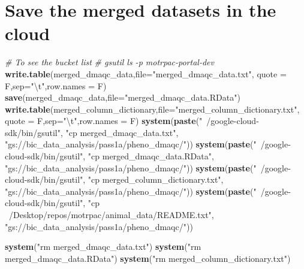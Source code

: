 \documentclass[]{article}
\newenvironment{Shaded}{\begin{snugshade}}{\end{snugshade}}
\newcommand{\KeywordTok}[1]{\textcolor[rgb]{0.13,0.29,0.53}{\textbf{#1}}}
\newcommand{\DataTypeTok}[1]{\textcolor[rgb]{0.13,0.29,0.53}{#1}}
\newcommand{\CharTok}[1]{\textcolor[rgb]{0.31,0.60,0.02}{#1}}
\newcommand{\StringTok}[1]{\textcolor[rgb]{0.31,0.60,0.02}{#1}}
\newcommand{\CommentTok}[1]{\textcolor[rgb]{0.56,0.35,0.01}{\textit{#1}}}
\newcommand{\NormalTok}[1]{#1}
\begin{document}
\section{Save the merged datasets in the
cloud}\label{save-the-merged-datasets-in-the-cloud}

\begin{Shaded}
\begin{Highlighting}[]
\CommentTok{# To see the bucket list}
\CommentTok{# gsutil ls -p motrpac-portal-dev}
\KeywordTok{write.table}\NormalTok{(merged_dmaqc_data,}\DataTypeTok{file=}\StringTok{"merged_dmaqc_data.txt"}\NormalTok{,}
            \DataTypeTok{quote =}\NormalTok{ F,}\DataTypeTok{sep=}\StringTok{"}\CharTok{\textbackslash{}t}\StringTok{"}\NormalTok{,}\DataTypeTok{row.names =}\NormalTok{ F)}
\KeywordTok{save}\NormalTok{(merged_dmaqc_data,}\DataTypeTok{file=}\StringTok{"merged_dmaqc_data.RData"}\NormalTok{)}
\KeywordTok{write.table}\NormalTok{(merged_column_dictionary,}\DataTypeTok{file=}\StringTok{"merged_column_dictionary.txt"}\NormalTok{,}
            \DataTypeTok{quote =}\NormalTok{ F,}\DataTypeTok{sep=}\StringTok{"}\CharTok{\textbackslash{}t}\StringTok{"}\NormalTok{,}\DataTypeTok{row.names =}\NormalTok{ F)}
\KeywordTok{system}\NormalTok{(}\KeywordTok{paste}\NormalTok{(}\StringTok{"~/google-cloud-sdk/bin/gsutil"}\NormalTok{, }\StringTok{"cp merged_dmaqc_data.txt"}\NormalTok{,}
             \StringTok{"gs://bic_data_analysis/pass1a/pheno_dmaqc/"}\NormalTok{))}
\KeywordTok{system}\NormalTok{(}\KeywordTok{paste}\NormalTok{(}\StringTok{"~/google-cloud-sdk/bin/gsutil"}\NormalTok{, }\StringTok{"cp merged_dmaqc_data.RData"}\NormalTok{,}
             \StringTok{"gs://bic_data_analysis/pass1a/pheno_dmaqc/"}\NormalTok{))}
\KeywordTok{system}\NormalTok{(}\KeywordTok{paste}\NormalTok{(}\StringTok{"~/google-cloud-sdk/bin/gsutil"}\NormalTok{, }\StringTok{"cp merged_column_dictionary.txt"}\NormalTok{,}
             \StringTok{"gs://bic_data_analysis/pass1a/pheno_dmaqc/"}\NormalTok{))}
\KeywordTok{system}\NormalTok{(}\KeywordTok{paste}\NormalTok{(}\StringTok{"~/google-cloud-sdk/bin/gsutil"}\NormalTok{, }
             \StringTok{"cp ~/Desktop/repos/motrpac/animal_data/README.txt"}\NormalTok{,}
             \StringTok{"gs://bic_data_analysis/pass1a/pheno_dmaqc/"}\NormalTok{))}

\KeywordTok{system}\NormalTok{(}\StringTok{"rm merged_dmaqc_data.txt"}\NormalTok{)}
\KeywordTok{system}\NormalTok{(}\StringTok{"rm merged_dmaqc_data.RData"}\NormalTok{)}
\KeywordTok{system}\NormalTok{(}\StringTok{"rm merged_column_dictionary.txt"}\NormalTok{)}
\end{Highlighting}
\end{Shaded}
\end{document}
